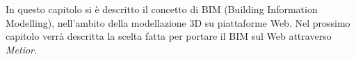 In questo capitolo si è descritto il concetto di BIM (Building Information Modelling),
nell'ambito della modellazione 3D su piattaforme Web. Nel prossimo
capitolo verrà descritta la scelta fatta per portare il BIM sul Web attraverso \emph{Metior}.
